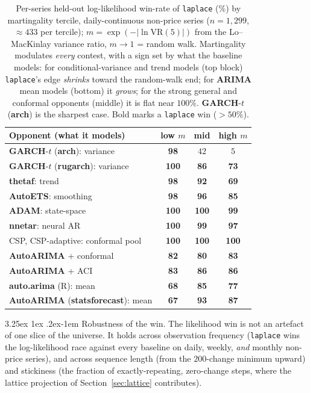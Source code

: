\documentclass[article]{jss}
\makeatletter
\renewcommand\paragraph{\@startsection{paragraph}{4}{\z@}%
  {3.25ex \@plus1ex \@minus.2ex}{-1em}%
  {\normalfont\normalsize\itshape}}
\providecommand{\proglang}[1]{\textsf{#1}}
\providecommand{\pkg}[1]{\textbf{#1}}
\providecommand{\code}[1]{\texttt{#1}}
\makeatother
\begin{document}
\begin{table}[t!]
\centering
\begin{tabular}{lccc}
\toprule
Opponent (what it models) & low $m$ & mid & high $m$ \\
\midrule
\pkg{GARCH}-$t$ (\pkg{arch}): variance    & \textbf{98} & $42$ & $5$ \\
\pkg{GARCH}-$t$ (\pkg{rugarch}): variance & \textbf{100} & \textbf{86} & \textbf{73} \\
\pkg{thetaf}: trend                        & \textbf{98} & \textbf{92} & \textbf{69} \\
\pkg{AutoETS}: smoothing                   & \textbf{98} & \textbf{96} & \textbf{85} \\
\midrule
\pkg{ADAM}: state-space                    & \textbf{100} & \textbf{100} & \textbf{99} \\
\pkg{nnetar}: neural AR                    & \textbf{100} & \textbf{99} & \textbf{97} \\
CSP, CSP-adaptive: conformal pool          & \textbf{100} & \textbf{100} & \textbf{100} \\
\pkg{AutoARIMA} + conformal                   & \textbf{82} & \textbf{80} & \textbf{83} \\
\pkg{AutoARIMA} + ACI                         & \textbf{83} & \textbf{86} & \textbf{86} \\
\midrule
\pkg{auto.arima} (\proglang{R}): mean      & \textbf{68} & \textbf{85} & \textbf{77} \\
\pkg{AutoARIMA} (\pkg{statsforecast}): mean & \textbf{67} & \textbf{93} & \textbf{87} \\
\bottomrule
\end{tabular}
\caption{Per-series held-out log-likelihood win-rate of \code{laplace} (\%) by
martingality tercile, daily-continuous non-price series ($n = 1{,}299$, $\approx
433$ per tercile); $m=\exp(-\lvert\ln\mathrm{VR}(5)\rvert)$ from the Lo--MacKinlay
variance ratio, $m\to1$ = random walk. Martingality modulates \emph{every}
contest, with a sign set by what the baseline models: for conditional-variance and
trend models (top block) \code{laplace}'s edge \emph{shrinks} toward the
random-walk end; for \pkg{ARIMA} mean models (bottom) it \emph{grows}; for the
strong general and conformal opponents (middle) it is flat near $100\%$.
\pkg{GARCH}-$t$ (\pkg{arch}) is the sharpest case. Bold marks a \code{laplace} win
($>50\%$).}
\label{tab:mart}
\end{table}

\paragraph{Robustness of the win.}
The likelihood win is not an artefact of one slice of the universe. It holds
across observation frequency (\code{laplace} wins the log-likelihood race
against every baseline on daily, weekly, \emph{and} monthly non-price series), and
across sequence length (from the $200$-change minimum upward) and stickiness (the
fraction of exactly-repeating, zero-change steps, where the lattice projection of
Section~\ref{sec:lattice} contributes).
\end{document}
